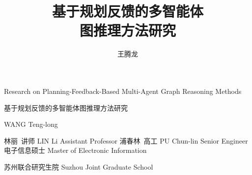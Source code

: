 \documentclass[algorithmlist,figurelist,tablelist,engineer,fontset=fandol,nocolorlinks]{template/seumasterthesis}
\newif\ifblindreview
\begin{document}
\ifblindreview
    \studentid{\mbox{}}
\else
\fi

\title
    {\texorpdfstring{基于规划反馈的多智能体\\图推理方法研究}{基于规划反馈的多智能体图推理方法研究}}        %
    {}         %
    {Research on Planning-Feedback-Based Multi-Agent Graph Reasoning Methods}  %
    {}            %

\spine
    {基于规划反馈的多智能体图推理方法研究} 
    {}                                                               

\author
    {\ifblindreview\mbox{}\else 王腾龙\fi}                        %
    {\ifblindreview\mbox{}\else WANG Teng-long\fi}                  %

\advisor
    {林丽\ 讲师}                %
    {LIN Li}        %
    {Assistant Professor}                     %
\coadvisor
    {浦春林\ 高工}                %
    {PU Chun-lin}        %
    {Senior Engineer}                     %
\degreetype                        %
    {电子信息硕士}
    {Master of Electronic Information}
\authorizedate{}                  %
\ifblindreview
    \committeechair{\mbox{}}
    \reviewer{盲审}{盲审}
\else
\fi
\department                        %
    {\ifblindreview\mbox{}\else 苏州联合研究生院\fi}
    {\ifblindreview\mbox{}\else Suzhou Joint Graduate School\fi}
\renewcommand{\todaychn}{2026 年 6 月 8 日}
\renewcommand{\todayeng}{June 8, 2026}
\end{document}
